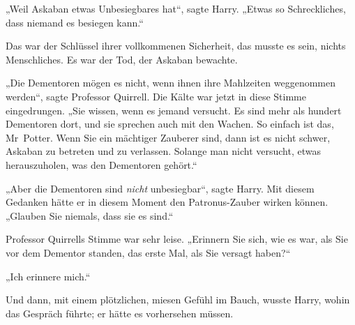 „Weil Askaban etwas Unbesiegbares hat“, sagte Harry.
„Etwas so Schreckliches, dass niemand es besiegen kann.“

Das war der Schlüssel ihrer vollkommenen Sicherheit, das musste es sein, nichts Menschliches. Es war der Tod, der Askaban bewachte.

„Die Dementoren mögen es nicht, wenn ihnen ihre Mahlzeiten weggenommen werden“, sagte Professor Quirrell. Die Kälte war jetzt in diese Stimme eingedrungen.
„Sie wissen, wenn es jemand versucht. Es sind mehr als hundert Dementoren dort, und sie sprechen auch mit den Wachen. So einfach ist das, Mr~Potter. Wenn Sie ein mächtiger Zauberer sind, dann ist es nicht schwer, Askaban zu betreten und zu verlassen. Solange man nicht versucht, etwas herauszuholen, was den Dementoren gehört.“

„Aber die Dementoren sind \emph{nicht} unbesiegbar“, sagte Harry. Mit diesem Gedanken hätte er in diesem Moment den Patronus-Zauber wirken können.
„Glauben Sie niemals, dass sie es sind.“

Professor Quirrells Stimme war sehr leise.
„Erinnern Sie sich, wie es war, als Sie vor dem Dementor standen, das erste Mal, als Sie versagt haben?“

„Ich erinnere mich.“

Und dann, mit einem plötzlichen, miesen Gefühl im Bauch, wusste Harry, wohin das Gespräch führte; er hätte es vorhersehen müssen.

